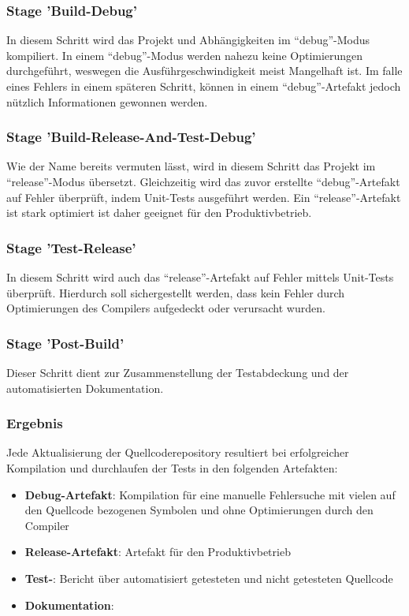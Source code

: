 \subsubsection{Stage 'Build-Debug'}
In diesem Schritt wird das Projekt und Abhängigkeiten im \enquote{debug}-Modus kompiliert.
In einem \enquote{debug}-Modus werden nahezu keine Optimierungen durchgeführt, weswegen die Ausführgeschwindigkeit meist Mangelhaft ist.
Im falle eines Fehlers in einem späteren Schritt, können in einem \enquote{debug}-Artefakt jedoch nützlich Informationen gewonnen werden.

\subsubsection{Stage 'Build-Release-And-Test-Debug'}
Wie der Name bereits vermuten lässt, wird in diesem Schritt das Projekt im \enquote{release}-Modus übersetzt.
Gleichzeitig wird das zuvor erstellte \enquote{debug}-Artefakt auf Fehler überprüft, indem Unit-Tests ausgeführt werden.
Ein \enquote{release}-Artefakt ist stark optimiert ist daher geeignet für den Produktivbetrieb.

\subsubsection{Stage 'Test-Release'}
In diesem Schritt wird auch das \enquote{release}-Artefakt auf Fehler mittels Unit-Tests überprüft.
Hierdurch soll sichergestellt werden, dass kein Fehler durch Optimierungen des Compilers aufgedeckt oder verursacht wurden.

\subsubsection{Stage 'Post-Build'}
Dieser Schritt dient zur Zusammenstellung der Testabdeckung und der automatisierten Dokumentation.

\subsubsection{Ergebnis}
Jede Aktualisierung der Quellcoderepository resultiert bei erfolgreicher Kompilation und durchlaufen der Tests in den folgenden Artefakten:
\begin{itemize}
	\item \textbf{Debug-Artefakt}: Kompilation für eine manuelle Fehlersuche mit vielen auf den Quellcode bezogenen Symbolen und ohne Optimierungen durch den Compiler
	\item \textbf{Release-Artefakt}: Artefakt für den Produktivbetrieb
	\item \textbf{Test-}: Bericht über automatisiert getesteten und nicht getesteten Quellcode
	\item \textbf{Dokumentation}: 
\end{itemize}


